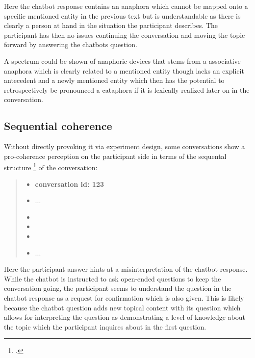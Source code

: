     Here the chatbot response contains an anaphora which
    cannot be mapped onto a specific mentioned entity in the previous text
    but is understandable as there is clearly a person at hand in the situation the participant describes.
    The participant has then no issues continuing the conversation and
    moving the topic forward by answering the chatbots question.

    A spectrum could be shown of anaphoric devices
    that stems from a associative anaphora which is clearly related to a mentioned entity
    though lacks an explicit antecedent and
    a newly mentioned entity which then has the potential to retrospectively be pronounced a cataphora
    if it is lexically realized later on in the conversation.

\subsection{Sequential coherence}

Without directly provoking it via experiment design,
some conversations show a pro-coherence perception on the participant side
in terms of the sequental structure \footcite{schegloff1996turn} of the conversation:


    \begin{quote}
    \begin{itemize}[label={}, leftmargin=0pt, itemsep=0.5em]
    \item \textbf{conversation id: 123}
    \item ...
    \item {}
    \item {}
    \item {}
    \item ...
    \end{itemize}
    \end{quote}

Here the participant answer hints at a misinterpretation of the chatbot response.
While the chatbot is instructed to ask open-ended questions to keep the conversation going,
the participant seems to understand the question in the chatbot response
as a request for confirmation which is also given.
This is likely because the chatbot question adds new topical content with its question
which allows for interpreting the question as demonstrating a level of knowledge about the topic
which the participant inquires about in the first question.

